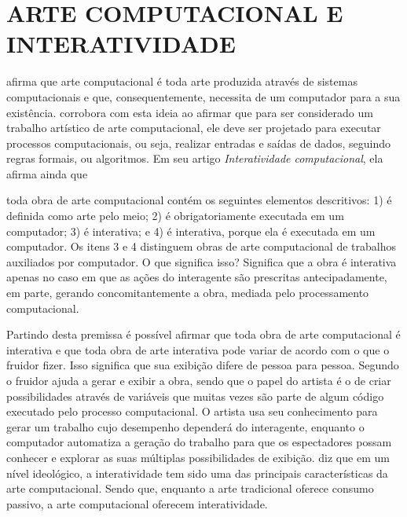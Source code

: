 \chapter{ARTE COMPUTACIONAL E INTERATIVIDADE}

 afirma que arte computacional é toda arte produzida através de sistemas  computacionais e que, consequentemente, necessita de um computador para a sua existência.  corrobora com esta ideia ao afirmar que para ser considerado um trabalho artístico de arte computacional, ele deve ser projetado para executar processos computacionais, ou seja, realizar entradas e saídas de dados, seguindo regras formais, ou algoritmos. Em seu artigo \textit{Interatividade computacional}, ela afirma ainda que

\begin{citacao}
toda obra de arte computacional contém os seguintes elementos descritivos: 1) é definida como arte pelo meio; 2) é obrigatoriamente executada em um computador; 3) é interativa; e 4) é interativa, porque ela é executada em um computador. Os itens 3 e 4 distinguem obras de arte computacional de trabalhos auxiliados por computador. O que significa isso? Significa que a obra é interativa apenas no caso em que as ações do interagente são prescritas antecipadamente, em parte, gerando concomitantemente a obra, mediada pelo processamento computacional.  \cite[p. 133]{venturelli}
\end{citacao}

Partindo desta premissa é possível afirmar que toda obra de arte computacional é interativa e que toda obra de arte interativa pode variar de acordo com o que o fruidor fizer. Isso significa que sua exibição difere de pessoa para pessoa. Segundo  o fruidor ajuda a gerar e exibir a obra, sendo que o papel do artista é o de criar possibilidades através de variáveis que muitas vezes são parte de algum código executado pelo processo computacional. O artista usa seu conhecimento para gerar um trabalho cujo desempenho dependerá do interagente, enquanto o computador automatiza a geração do trabalho para que os espectadores possam conhecer e explorar as suas múltiplas possibilidades de exibição.  diz que em um nível ideológico, a interatividade tem sido uma das principais características da arte computacional. Sendo que, enquanto a arte tradicional oferece consumo passivo, a arte computacional oferecem interatividade.

